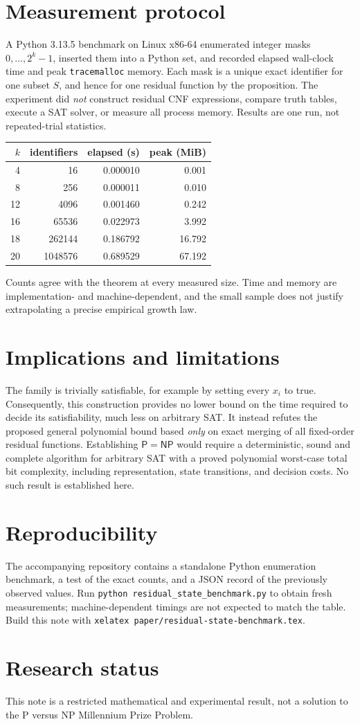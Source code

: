 \documentclass[11pt,a4paper]{article}
\begin{document}
\section{Measurement protocol}
A Python 3.13.5 benchmark on Linux x86-64 enumerated integer masks $0,\ldots,2^k-1$, inserted them into a Python set, and recorded elapsed wall-clock time and peak \texttt{tracemalloc} memory. Each mask is a unique exact identifier for one subset $S$, and hence for one residual function by the proposition. The experiment did \emph{not} construct residual CNF expressions, compare truth tables, execute a SAT solver, or measure all process memory. Results are one run, not repeated-trial statistics.
\begin{center}
\begin{tabular}{rrrr}
\toprule
$k$ & identifiers & elapsed (s) & peak (MiB)\\
\midrule
4 & 16 & 0.000010 & 0.001\\
8 & 256 & 0.000011 & 0.010\\
12 & 4096 & 0.001460 & 0.242\\
16 & 65536 & 0.022973 & 3.992\\
18 & 262144 & 0.186792 & 16.792\\
20 & 1048576 & 0.689529 & 67.192\\
\bottomrule
\end{tabular}
\end{center}
Counts agree with the theorem at every measured size. Time and memory are implementation- and machine-dependent, and the small sample does not justify extrapolating a precise empirical growth law.
\section{Implications and limitations}
The family is trivially satisfiable, for example by setting every $x_i$ to true. Consequently, this construction provides no lower bound on the time required to decide its satisfiability, much less on arbitrary SAT. It instead refutes the proposed general polynomial bound based \emph{only} on exact merging of all fixed-order residual functions. Establishing $\mathsf{P}=\mathsf{NP}$ would require a deterministic, sound and complete algorithm for arbitrary SAT with a proved polynomial worst-case total bit complexity, including representation, state transitions, and decision costs. No such result is established here.
\section{Reproducibility}
The accompanying repository contains a standalone Python enumeration benchmark, a test of the exact counts, and a JSON record of the previously observed values. Run \texttt{python residual\_state\_benchmark.py} to obtain fresh measurements; machine-dependent timings are not expected to match the table. Build this note with \texttt{xelatex paper/residual-state-benchmark.tex}.
\section*{Research status}
This note is a restricted mathematical and experimental result, not a solution to the P versus NP Millennium Prize Problem.
\end{document}
